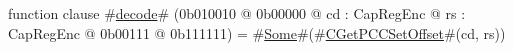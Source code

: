 function clause #\hyperref[zdecode]{decode}# (0b010010 @ 0b00000 @ cd : CapRegEnc @ rs : CapRegEnc @    0b00111 @ 0b111111) = #\hyperref[zSome]{Some}#(#\hyperref[zCGetPCCSetOffset]{CGetPCCSetOffset}#(cd, rs))
